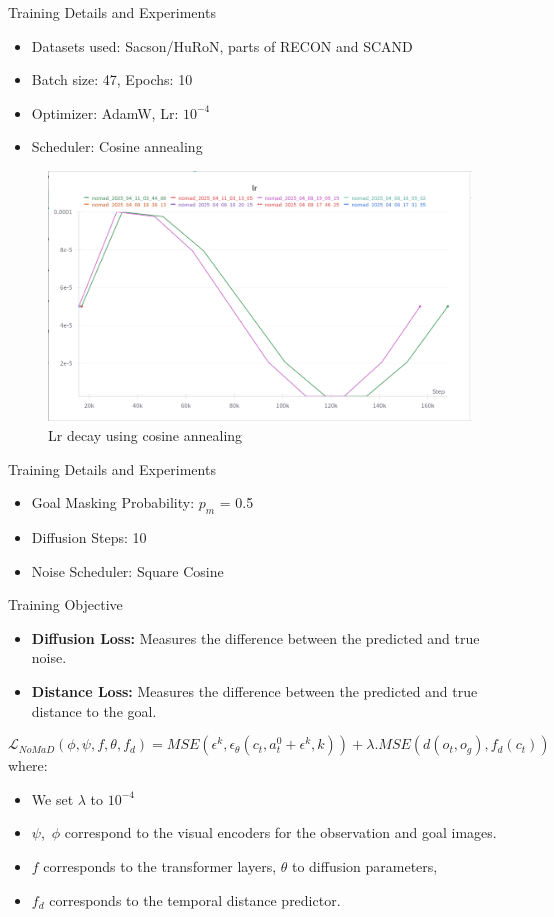 \documentclass{beamer}
\begin{document}
\begin{frame}{Training Details and Experiments}
\begin{itemize}
    \item Datasets used: Sacson/HuRoN, parts of RECON and SCAND
    \item Batch size: 47, Epochs: 10
    \item Optimizer: AdamW, Lr: $10^{-4}$ 
    \item Scheduler: Cosine annealing
\end{itemize}
\begin{figure}
    \centering
    \includegraphics[width=0.8\linewidth]{lrdecay.png}
    \caption{Lr decay using cosine annealing}
    \label{fig:lrdecay}
\end{figure}
\end{frame}
\begin{frame}{Training Details and Experiments}
    \begin{itemize}
        \item Goal Masking Probability: $p_m$ = 0.5
        \item Diffusion Steps: 10
        \item Noise Scheduler: Square Cosine
    \end{itemize}
    \pause
    \begin{block}{Training Objective}
        \begin{itemize}
            \item \textbf{Diffusion Loss:} Measures the difference between the predicted and true noise.
            \item \textbf{Distance Loss:} Measures the difference between the predicted and true distance to the goal.
        \end{itemize}
    \end{block}
    \[ \mathcal{L}_{NoMaD}(\phi,\psi,f,\theta,f_d) = MSE(\epsilon^{k}, \epsilon_{\theta}(c_t, a^{0}_t + \epsilon^{k},k)) + \lambda .MSE(d(o_t, o_g), f_{d}(c_t))\]
    where:\\
    \begin{itemize}
        \item We set $\lambda$ to $10^{-4}$
        \item $\psi$,\ $\phi$ correspond to the visual encoders for the observation and goal images.
        \item $f$ corresponds to the transformer layers, $\theta$ to diffusion parameters,
        \item $f_d$ corresponds to the temporal distance predictor.
    \end{itemize}
\end{frame}
\end{document}
